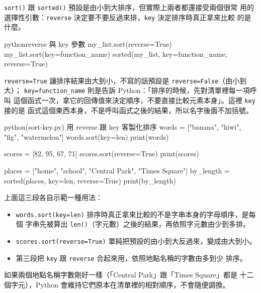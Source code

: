 \texttt{sort()} 跟 \texttt{sorted()} 預設是由小到大排序，但實際上兩者都還接受兩個很常
用的選擇性引數：\texttt{reverse} 決定要不要反過來排，\texttt{key} 決定排序時真正拿來比較
的是什麼。

\begin{code}{python}{reverse 與 key 參數}
my_list.sort(reverse=True)
my_list.sort(key=function_name)
sorted(my_list, key=function_name, reverse=True)
\end{code}

\texttt{reverse=True} 讓排序結果由大到小，不寫的話預設是 \texttt{reverse=False}（由小到
大）；
\texttt{key=function\_name} 則是告訴 Python：「排序的時候，先對清單裡每一項呼叫
這個函式一次，拿它的回傳值來決定順序，不要直接比較元素本身」。這裡 \texttt{key} 接的是
函式這個東西本身，不是呼叫函式之後的結果，所以名字後面不加括號。

\begin{example}{python}{(sort-key.py) 用 reverse 跟 key 客製化排序}
words = ["banana", "kiwi", "fig", "watermelon"]
words.sort(key=len)
print(words)

scores = [82, 95, 67, 71]
scores.sort(reverse=True)
print(scores)

places = ["home", "school", "Central Park", "Times Square"]
by_length = sorted(places, key=len, reverse=True)
print(by_length)
\end{example}


上面這三段各自示範一種用法：

\begin{itemize}
\item \texttt{words.sort(key=len)} 排序時真正拿來比較的不是字串本身的字母順序，是每個
字串先被算出 \texttt{len()}（字元數）之後的結果，再依照字元數由少到多排。
\item \texttt{scores.sort(reverse=True)} 單純把預設的由小到大反過來，變成由大到小。
\item 第三段把 \texttt{key} 跟 \texttt{reverse} 合起來用，依照地點名稱的字數由多到少
排序。
\end{itemize}

如果兩個地點名稱字數剛好一樣（「Central Park」跟「Times Square」都是
十二個字元），Python 會維持它們原本在清單裡的相對順序，不會隨便調換。

